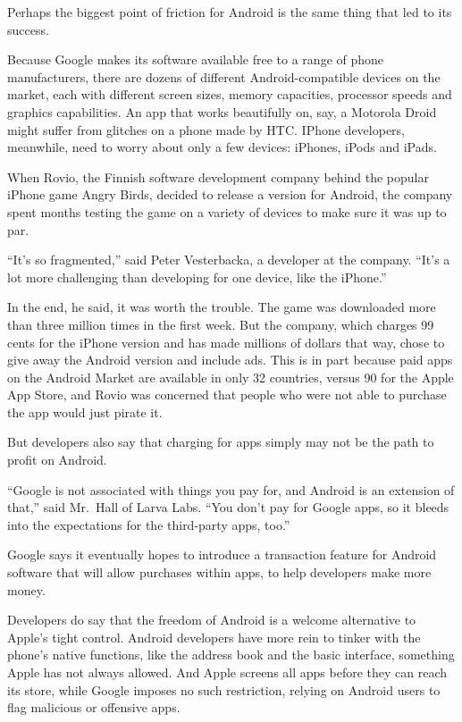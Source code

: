 ﻿\documentclass[12pt]{article}
\begin{document}
Perhaps the biggest point of friction for Android is the same thing that led to its success.

Because Google makes its software available free to a range of phone manufacturers, there are dozens
of different Android-compatible devices on the market, each with different screen sizes, memory
capacities, processor speeds and graphics capabilities. An app that works beautifully on, say, a
Motorola Droid might suffer from glitches on a phone made by HTC. IPhone developers, meanwhile, need
to worry about only a few devices: iPhones, iPods and iPads.

When Rovio, the Finnish software development company behind the popular iPhone game Angry Birds,
decided to release a version for Android, the company spent months testing the game on a variety of
devices to make sure it was up to par.

``It's so fragmented,'' said Peter Vesterbacka, a developer at the company. ``It's a lot more
challenging than developing for one device, like the iPhone.''

In the end, he said, it was worth the trouble. The game was downloaded more than three million times
in the first week. But the company, which charges 99 cents for the iPhone version and has made
millions of dollars that way, chose to give away the Android version and include ads. This is in
part because paid apps on the Android Market are available in only 32 countries, versus 90 for the
Apple App Store, and Rovio was concerned that people who were not able to purchase the app would
just pirate it.

But developers also say that charging for apps simply may not be the path to profit on Android.

``Google is not associated with things you pay for, and Android is an extension of that,'' said
Mr.~Hall of Larva Labs. ``You don't pay for Google apps, so it bleeds into the expectations for the
third-party apps, too.''

Google says it eventually hopes to introduce a transaction feature for Android software that will
allow purchases within apps, to help developers make more money.

Developers do say that the freedom of Android is a welcome alternative to Apple's tight control.
Android developers have more rein to tinker with the phone's native functions, like the address book
and the basic interface, something Apple has not always allowed. And Apple screens all apps before
they can reach its store, while Google imposes no such restriction, relying on Android users to flag
malicious or offensive apps.
\end{document}
